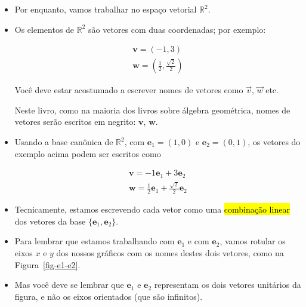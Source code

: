 \documentclass[
  letterpaper,
  DIV=11,
  numbers=noendperiod]{scrreprt}
\begin{document}
\begin{itemize}
\item
  Por enquanto, vamos trabalhar no espaço vetorial $\mathbb{R}^2$.
\item
  Os elementos de $\mathbb{R}^2$ são vetores com duas coordenadas; por
  exemplo:

  \[
  \begin{array}{l}
    \mathbf{v} = (-1, 3)\\
    \mathbf{w} = \left( \frac12, \frac{\sqrt{2}}{2} \right)
  \end{array}
  \]

  \begin{tcolorbox}[standard jigsaw,toprule=.15mm, bottomrule=.15mm, opacityback=0, toptitle=1mm, bottomtitle=1mm, colbacktitle=quarto-callout-warning-color!10!white, left=2mm, titlerule=0mm, title=\textcolor{quarto-callout-warning-color}{\faExclamationTriangle}\hspace{0.5em}{Notação: vetores em negrito}, arc=.35mm, rightrule=.15mm, colback=white, coltitle=black, colframe=quarto-callout-warning-color-frame, opacitybacktitle=0.6, leftrule=.75mm]
  Você deve estar acostumado a escrever nomes de vetores como $\vec v$,
  $\vec w$ etc.

  Neste livro, como na maioria dos livros sobre álgebra geométrica,
  nomes de vetores serão escritos em negrito: $\mathbf{v}$,
  $\mathbf{w}$.
  \end{tcolorbox}
\item
  Usando a base canônica de $\mathbb{R}^2$, com
  $\mathbf{e}_{1} = (1, 0)$ e $\mathbf{e}_{2} = (0, 1)$, os vetores do
  exemplo acima podem ser escritos como

  \[
  \begin{array}{l}
    \mathbf{v} = -1\mathbf{e}_{1} + 3\mathbf{e}_{2}\\
    \mathbf{w} = \frac12 \mathbf{e}_{1} + \frac{\sqrt{2}}{2}\mathbf{e}_{2}
  \end{array}
  \]
\item
  Tecnicamente, estamos escrevendo cada vetor como uma {\hl{combinação
  linear}} dos vetores da base $\{ \mathbf{e}_{1}, \mathbf{e}_{2} \}$.
\item
  Para lembrar que estamos trabalhando com $\mathbf{e}_{1}$ e com
  $\mathbf{e}_{2}$, vamos rotular os eixos $x$ e $y$ dos nossos gráficos
  com os nomes destes dois vetores, como na Figura~\ref{fig-e1-e2}.
\item
  Mas você deve se lembrar que $\mathbf{e}_{1}$ e $\mathbf{e}_{2}$
  representam os dois vetores unitários da figura, e não os eixos
  orientados (que são infinitos).


\end{itemize}
\end{document}
